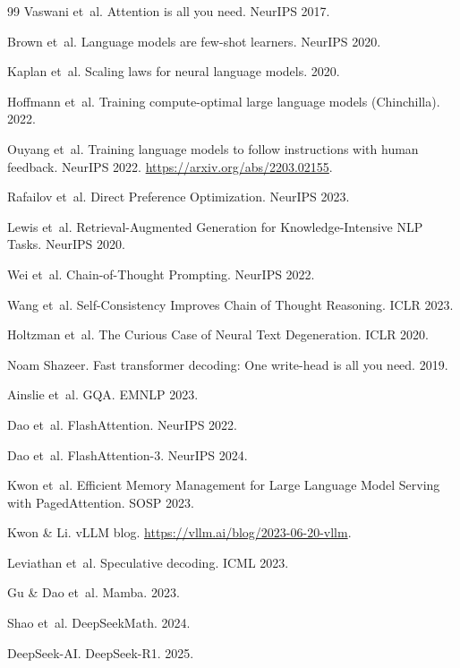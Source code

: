 \documentclass[11pt,a4paper]{article}
\begin{document}
{{\begin{thebibliography}{99}
Vaswani et~al. Attention is all you need. NeurIPS 2017.

Brown et~al. Language models are few-shot learners. NeurIPS 2020.

Kaplan et~al. Scaling laws for neural language models. 2020.

Hoffmann et~al. Training compute-optimal large language models (Chinchilla). 2022.

Ouyang et~al. Training language models to follow instructions with human feedback. NeurIPS 2022.
\url{https://arxiv.org/abs/2203.02155}.

Rafailov et~al. Direct Preference Optimization. NeurIPS 2023.

Lewis et~al. Retrieval-Augmented Generation for Knowledge-Intensive NLP Tasks. NeurIPS 2020.

Wei et~al. Chain-of-Thought Prompting. NeurIPS 2022.

Wang et~al. Self-Consistency Improves Chain of Thought Reasoning. ICLR 2023.

Holtzman et~al. The Curious Case of Neural Text Degeneration. ICLR 2020.

Noam Shazeer. Fast transformer decoding: One write-head is all you need. 2019.

Ainslie et~al. GQA. EMNLP 2023.

Dao et~al. FlashAttention. NeurIPS 2022.

Dao et~al. FlashAttention-3. NeurIPS 2024.

Kwon et~al. Efficient Memory Management for Large Language Model Serving with PagedAttention. SOSP 2023.

Kwon \& Li. vLLM blog. \url{https://vllm.ai/blog/2023-06-20-vllm}.

Leviathan et~al. Speculative decoding. ICML 2023.

Gu \& Dao et~al. Mamba. 2023.

Shao et~al. DeepSeekMath. 2024.

DeepSeek-AI. DeepSeek-R1. 2025.


\end{thebibliography}}}
\end{document}
